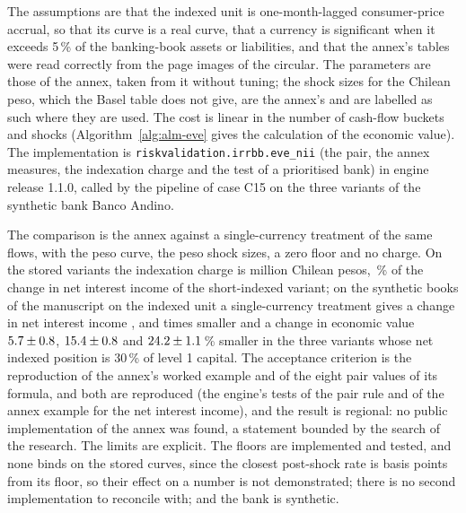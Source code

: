 The assumptions are that the indexed unit is one-month-lagged consumer-price accrual, so that its curve is a real curve, that a currency is significant when it exceeds 5\,\% of
the banking-book assets or liabilities, and that the annex's tables were read correctly from the page images of the circular. The parameters are those of the annex, taken from it
without tuning; the shock sizes for the Chilean peso, which the Basel table does not give, are the annex's and are labelled as such where they are used. The cost is linear in the number of cash-flow buckets and shocks (Algorithm~\ref{alg:alm-eve} gives the calculation of the economic value). The
implementation is \texttt{riskvalidation.irrbb.eve\_nii} (the pair, the annex measures, the indexation charge and the test of a prioritised bank) in engine release 1.1.0,
called by the pipeline of case C15 on the three variants of the synthetic bank Banco Andino.

The comparison is the annex against a single-currency treatment of the same flows, with the peso curve, the peso shock sizes, a zero floor and no charge. On the stored variants
the indexation charge is \pxSevenCharge{} million Chilean pesos, \pxSevenShare{}\,\% of the change in net interest income of the short-indexed variant; on the synthetic books of the manuscript on the
indexed unit a single-currency treatment gives a change in net interest income \pxPpSevenRatioLng{}, \pxPpSevenRatioSht{} and \pxPpSevenRatioOff{} times smaller and a change in economic value
$5.7\pm0.8$, $15.4\pm0.8$ and $24.2\pm1.1$\,\% smaller in the three variants whose net indexed position is 30\,\% of level 1 capital.
The acceptance criterion is the reproduction of the annex's worked example and of the eight pair values of its formula, and both are reproduced (the engine's tests of the pair rule and of the annex example for the net interest income),
and the result is regional: no public implementation of the annex was found, a statement bounded by the search of the research. The limits are explicit. The floors are implemented and
tested, and none binds on the stored curves, since the closest post-shock rate is \pxSevenFloorBp{} basis points from its floor, so their effect on a number is not demonstrated;
there is no second implementation to reconcile with; and the bank is synthetic.

